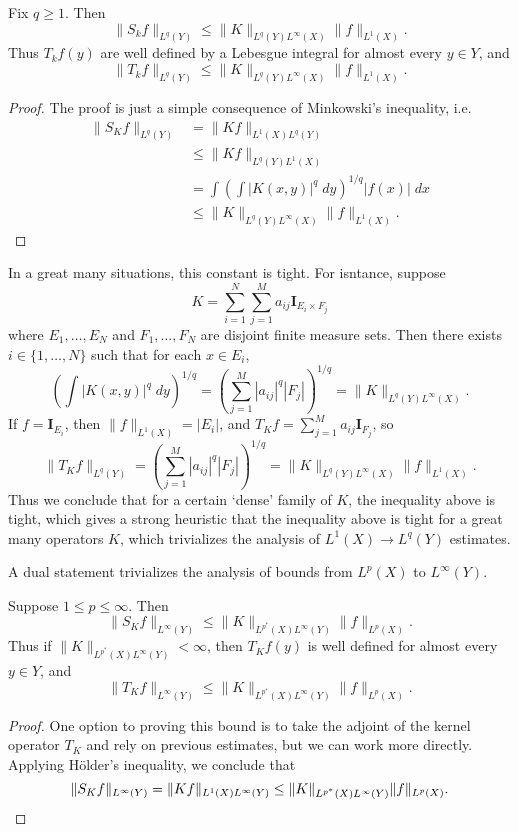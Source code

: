 \begin{theorem}
  Fix $q \geq 1$. Then
  \[ \| S_k f \|_{L^q(Y)} \leq \| K \|_{L^q(Y)L^\infty(X)} \| f \|_{L^1(X)}. \]
  Thus $T_k f(y)$ are well defined by a Lebesgue integral for almost every $y \in Y$, and
  \[ \| T_k f \|_{L^q(Y)} \leq \| K \|_{L^q(Y) L^\infty(X)} \| f \|_{L^1(X)}. \]
\end{theorem}
\begin{proof}
  The proof is just a simple consequence of Minkowski's inequality, i.e.
  \begin{align*}
    \| S_K f \|_{L^q(Y)} &= \| K f \|_{L^1(X) L^q(Y)}\\
    &\leq \| Kf \|_{L^q(Y) L^1(X)}\\
    &= \int \left( \int |K(x,y)|^q\; dy \right)^{1/q} |f(x)|\; dx\\
    &\leq \| K \|_{L^q(Y)L^\infty(X)} \| f \|_{L^1(X)}.
  \end{align*}
\end{proof}

\begin{remark}
  In a great many situations, this constant is tight. For isntance, suppose
  \[ K = \sum_{i = 1}^N \sum_{j = 1}^M a_{ij} \mathbf{I}_{E_i \times F_j} \]
  where $E_1,\dots,E_N$ and $F_1,\dots,F_N$ are disjoint finite measure sets. Then there exists $i \in \{ 1, \dots, N \}$ such that for each $x \in E_i$,
  \[ \left( \int |K(x,y)|^q\; dy \right)^{1/q} = \left( \sum_{j = 1}^M |a_{ij}|^q |F_j| \right)^{1/q} = \| K \|_{L^q(Y) L^\infty(X)}. \]
  If $f = \mathbf{I}_{E_i}$, then $\| f \|_{L^1(X)} = |E_i|$, and $T_K f = \sum_{j = 1}^M a_{ij} \mathbf{I}_{F_j}$, so
  \[ \| T_K f \|_{L^q(Y)} = \left( \sum_{j = 1}^M |a_{ij}|^q |F_j| \right)^{1/q} = \| K \|_{L^q(Y)L^\infty(X)} \| f \|_{L^1(X)}. \]
  Thus we conclude that for a certain `dense' family of $K$, the inequality above is tight, which gives a strong heuristic that the inequality above is tight for a great many operators $K$, which trivializes the analysis of $L^1(X) \to L^q(Y)$ estimates.
\end{remark}

A dual statement trivializes the analysis of bounds from $L^p(X)$ to $L^\infty(Y)$.

\begin{theorem}
  Suppose $1 \leq p \leq \infty$. Then
  \[ \| S_K f \|_{L^\infty(Y)} \leq \| K \|_{L^{p^*}(X) L^\infty(Y)} \| f \|_{L^p(X)}. \]
  Thus if $\| K \|_{L^{p^*}(X) L^\infty(Y)} < \infty$, then $T_K f(y)$ is well defined for almost every $y \in Y$, and
  \[ \| T_K f \|_{L^\infty(Y)} \leq \| K \|_{L^{p^*}(X) L^\infty(Y)} \| f \|_{L^p(X)}. \]
\end{theorem}
\begin{proof}
  One option to proving this bound is to take the adjoint of the kernel operator $T_K$ and rely on previous estimates, but we can work more directly. Applying H\"{o}lder's inequality, we conclude that
  \[ \| S_K f \|_{L^\infty(Y)} = \| K f \|_{L^1(X) L^\infty(Y)} \leq \| K \|_{L^{p^*}(X) L^\infty(Y)} \| f \|_{L^p(X)}. \qedhere \]
\end{proof}

